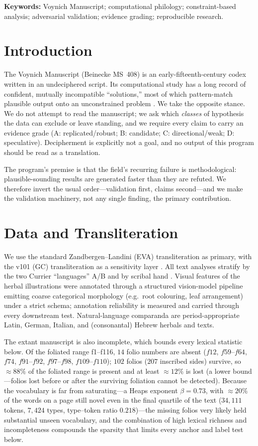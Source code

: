 \documentclass[11pt]{article}
\begin{document}
\noindent\textbf{Keywords:} Voynich Manuscript; computational philology;
constraint-based analysis; adversarial validation; evidence grading; reproducible
research.

\section{Introduction}
The Voynich Manuscript (Beinecke MS~408) is an early-fifteenth-century codex written
in an undeciphered script. Its computational study has a long record of confident,
mutually incompatible ``solutions,'' most of which pattern-match plausible output onto
an unconstrained problem \citep{reddy2011know,bowern2021linguistics}. We take the
opposite stance. We do not attempt to read the manuscript; we ask which \emph{classes}
of hypothesis the data can exclude or leave standing, and we require every claim to
carry an evidence grade (A: replicated/robust; B: candidate; C: directional/weak; D:
speculative). Decipherment is explicitly not a goal, and no output of this program
should be read as a translation.

The program's premise is that the field's recurring failure is methodological:
plausible-sounding results are generated faster than they are refuted. We therefore
invert the usual order---validation first, claims second---and we make the validation
machinery, not any single finding, the primary contribution.

\section{Data and Transliteration}
We use the standard Zandbergen--Landini (EVA) transliteration as primary, with the
v101 (GC) transliteration as a sensitivity layer \citep{zandbergen_voynichnu}. All
text analyses stratify by the two Currier ``languages'' A/B \citep{currier1976} and by
scribal hand \citep{fagindavis2020hands}. Visual features of the herbal illustrations
were annotated through a structured vision-model pipeline emitting coarse categorical
morphology (e.g.\ root colouring, leaf arrangement) under a strict schema; annotation
reliability is measured and carried through every downstream test. Natural-language
comparanda are period-appropriate Latin, German, Italian, and (consonantal) Hebrew
herbals and texts.

The extant manuscript is also incomplete, which bounds every lexical statistic below.
Of the foliated range f1--f116, $14$ folio numbers are absent ($f12$, $f59$--$f64$,
$f74$, $f91$--$f92$, $f97$--$f98$, $f109$--$f110$); $102$ folios ($207$ inscribed
sides) survive, so $\approx\!88\%$ of the foliated range is present and at least
$\approx\!12\%$ is lost (a lower bound---folios lost before or after the surviving
foliation cannot be detected). Because the vocabulary is far from saturating---a Heaps
exponent $\beta=0.73$, with $\approx\!20\%$ of the words on a page still novel even in
the final quartile of the text ($34{,}111$ tokens, $7{,}424$ types, type--token ratio
$0.218$)---the missing folios very likely held substantial unseen vocabulary, and the
combination of high lexical richness and incompleteness compounds the sparsity that
limits every anchor and label test below.
\end{document}
